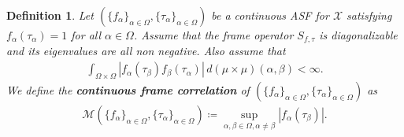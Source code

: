 \documentclass{amsart}
\newtheorem{definition}[theorem]{Definition}
\begin{document}
 \begin{definition}
 Let  $ (\{f_\alpha\}_{\alpha\in \Omega}, \{\tau_\alpha\}_{\alpha\in \Omega}) $ be a continuous ASF for $\mathcal{X}$ satisfying $f_\alpha(\tau_\alpha)=1$ for all $\alpha \in \Omega$. Assume that  the  frame operator 
 $	S_{f, \tau}$  is diagonalizable and its eigenvalues are all non negative. Also assume that 
 \begin{align*}
 	\int_{\Omega\times\Omega}|f_\alpha(\tau_\beta)f_\beta(\tau_\alpha)|\, d(\mu\times\mu)(\alpha,\beta)<\infty.
 \end{align*} 
	We define the  \textbf{ continuous frame correlation} of $ (\{f_\alpha\}_{\alpha\in \Omega}, \{\tau_\alpha\}_{\alpha\in \Omega})$ as 
 	\begin{align*}
 		\mathcal{M}(\{f_\alpha\}_{\alpha\in \Omega}, \{\tau_\alpha\}_{\alpha\in \Omega})\coloneqq 	\sup_{\alpha, \beta \in \Omega, \alpha\neq \beta}|f_\alpha(\tau_\beta)|.
 	\end{align*}
 \end{definition}
  
\end{document}

